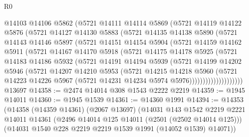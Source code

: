 \begin{lexlean}{R0}
\begin{coremodule}
            @14103
            @14106
            @5862
            (@5721
              @14111
              @14114
              @5869
              (@5721
                @14119
                @14122
                @5876
                (@5721
                  @14127
                  @14130
                  @5883
                  (@5721
                    @14135
                    @14138
                    @5890
                    (@5721
                      @14143
                      @14146
                      @5897
                      (@5721
                        @14151
                        @14154
                        @5904
                        (@5721
                          @14159
                          @14162
                          @5911
                          (@5721
                            @14167
                            @14170
                            @5918
                            (@5721
                              @14175
                              @14178
                              @5925
                              (@5721
                                @14183
                                @14186
                                @5932
                                (@5721
                                  @14191
                                  @14194
                                  @5939
                                  (@5721
                                    @14199
                                    @14202
                                    @5946
                                    (@5721
                                      @14207
                                      @14210
                                      @5953
                                      (@5721
                                        @14215
                                        @14218
                                        @5960
                                        (@5721
                                          @14223
                                          @14226
                                          @5967
                                          (@5721 @14231 @14234 @5974 @5976))))))))))))))))))))
    @13697
@14358 := @2474 @14014 @308 @1543 @2222 @2219
@14359 := @1945 @14011
@14360 := @1945 @1539
@14361 := @14360 @1991
@14394 := @14353
    (@14358
      (@14359 @14361)
      (@2067 @13697)
      (@14031
        @143
        @1542
        @2219
        @2221
        @14011
        @14361
        (@2496 @14014 @125 @14011 (@2501 (@2502 @14014 @125)))
        (@14031 @1540 @228 @2219 @2219 @1539 @1991 (@14052 @1539) @14071))

\end{coremodule}
\end{lexlean}
